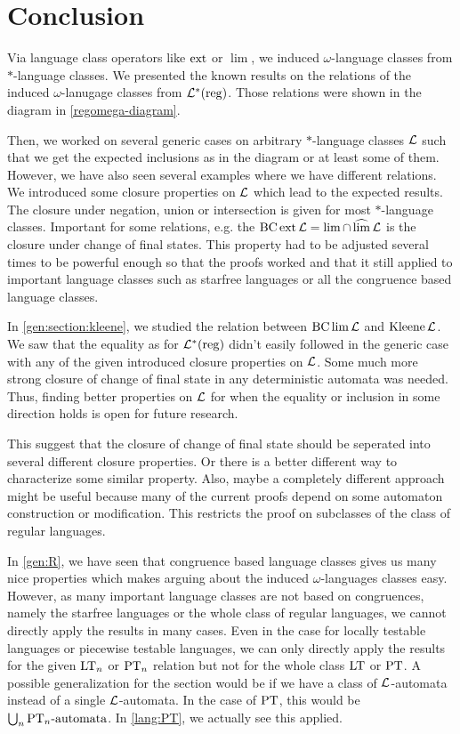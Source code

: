 \section{Conclusion}
\label{chapter:conclusion}

Via language class operators like $\operatorname{ext}$ or $\lim$, we induced $\omega$-language classes from $*$-language classes. We presented the known results on the relations of the induced $\omega$-lanugage classes from $\mathcal{L}^*(\textup{\textrm{reg}})$. Those relations were shown in the diagram in \cref{regomega-diagram}.

Then, we worked on several generic cases on arbitrary $*$-language classes $\mathcal{L}$ such that we get the expected inclusions as in the diagram or at least some of them. However, we have also seen several examples where we have different relations. We introduced some closure properties on $\mathcal{L}$ which lead to the expected results. The closure under negation, union or intersection is given for most $*$-language classes. Important for some relations, e.g. the $\operatorname{BC} \operatorname{ext} \mathcal{L} = \lim \cap \operatorname{\widehat{lim}} \mathcal{L}$ is the closure under change of final states. This property had to be adjusted several times to be powerful enough so that the proofs worked and that it still applied to important language classes such as starfree languages or all the congruence based language classes.

In \cref{gen:section:kleene}, we studied the relation between $\operatorname{BC} \lim \mathcal{L}$ and $\operatorname{Kleene} \mathcal{L}$. We saw that the equality as for $\mathcal{L}^*(\textup{\textrm{reg}})$ didn't easily followed in the generic case with any of the given introduced closure properties on $\mathcal{L}$. Some much more strong closure of change of final state in any deterministic automata was needed. Thus, finding better properties on $\mathcal{L}$ for when the equality or inclusion in some direction holds is open for future research.

This suggest that the closure of change of final state should be seperated into several different closure properties. Or there is a better different way to characterize some similar property. Also, maybe a completely different approach might be useful because many of the current proofs depend on some automaton construction or modification. This restricts the proof on subclasses of the class of regular languages.

In \cref{gen:R}, we have seen that congruence based language classes gives us many nice properties which makes arguing about the induced $\omega$-languages classes easy. However, as many important language classes are not based on congruences, namely the starfree languages or the whole class of regular languages, we cannot directly apply the results in many cases. Even in the case for locally testable languages or piecewise testable languages, we can only directly apply the results for the given $\textup{\textrm{LT}}_n$ or $\textup{\textrm{PT}}_n$ relation but not for the whole class $\textup{\textrm{LT}}$ or $\textup{\textrm{PT}}$. A possible generalization for the section would be if we have a class of $\mathcal{L}$-automata instead of a single $\mathcal{L}$-automata. In the case of $\textup{\textrm{PT}}$, this would be $\bigcup_n \text{$\textup{\textrm{PT}}_n$-automata}$. In \cref{lang:PT}, we actually see this applied.

